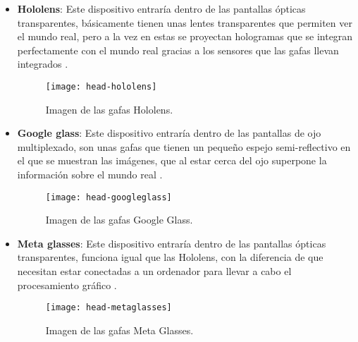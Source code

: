 \begin{itemize}
  \item \textbf{Hololens}: Este dispositivo entraría dentro de las pantallas ópticas transparentes, básicamente tienen unas lentes transparentes que permiten ver el mundo real, pero a la vez en estas se proyectan hologramas que se integran perfectamente con el mundo real gracias a los sensores que las gafas llevan integrados \cite{hololens}.

  \begin{figure}[h]
    \centering
    \texttt{[image: head-hololens]}
    \caption{Imagen de las gafas Hololens.\protect\footnotemark}
    \label{figura-hololens}
  \end{figure}



  \item \textbf{Google glass}: Este dispositivo entraría dentro de las pantallas de ojo multiplexado, son unas gafas que tienen un pequeño espejo semi-reflectivo en el que se muestran las imágenes, que al estar cerca del ojo superpone la información sobre el mundo real \cite{likamwa}.

  \begin{figure}[h]
    \centering
    \texttt{[image: head-googleglass]}
    \caption{Imagen de las gafas Google Glass.\protect\footnotemark}
    \label{figura-googleglass}
  \end{figure}


\newpage

  \item \textbf{Meta glasses}: Este dispositivo entraría dentro de las pantallas ópticas transparentes, funciona igual que las Hololens, con la diferencia de que necesitan estar conectadas a un ordenador para llevar a cabo el procesamiento gráfico \cite{meta-vision}.

  \begin{figure}[h]
    \centering
    \texttt{[image: head-metaglasses]}
    \caption{Imagen de las gafas Meta Glasses.\protect\footnotemark}
    \label{figura-metaglasses}
  \end{figure}




\end{itemize}
